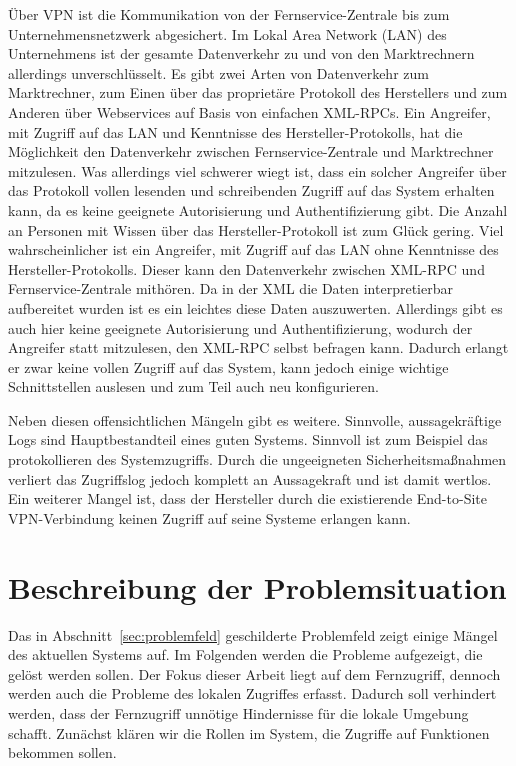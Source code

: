 \documentclass[11pt,a4paper]{report}
\begin{document}
Über VPN ist die Kommunikation von der Fernservice-Zentrale bis zum Unternehmensnetzwerk abgesichert. Im Lokal Area Network (LAN) des Unternehmens ist der gesamte Datenverkehr zu und von den Marktrechnern allerdings unverschlüsselt. Es gibt zwei Arten von Datenverkehr zum Marktrechner, zum Einen über das proprietäre Protokoll des Herstellers und zum Anderen über Webservices auf Basis von einfachen XML-RPCs. Ein Angreifer, mit Zugriff auf das LAN und Kenntnisse des Hersteller-Protokolls, hat die Möglichkeit den Datenverkehr zwischen Fernservice-Zentrale und Marktrechner mitzulesen. Was allerdings viel schwerer wiegt ist, dass ein solcher Angreifer über das Protokoll vollen lesenden und schreibenden Zugriff auf das System erhalten kann, da es keine geeignete Autorisierung und Authentifizierung gibt. Die Anzahl an Personen mit Wissen über das Hersteller-Protokoll ist zum Glück gering. Viel wahrscheinlicher ist ein Angreifer, mit Zugriff auf das LAN ohne Kenntnisse des Hersteller-Protokolls. Dieser kann den Datenverkehr zwischen XML-RPC und Fernservice-Zentrale mithören. Da in der XML die Daten interpretierbar aufbereitet wurden ist es ein leichtes diese Daten auszuwerten. Allerdings gibt es auch hier keine geeignete Autorisierung und Authentifizierung, wodurch der Angreifer statt mitzulesen, den XML-RPC selbst befragen kann. Dadurch erlangt er zwar keine vollen Zugriff auf das System, kann jedoch einige wichtige Schnittstellen auslesen und zum Teil auch neu konfigurieren. 

Neben diesen offensichtlichen Mängeln gibt es weitere. Sinnvolle, aussagekräftige Logs sind Hauptbestandteil eines guten Systems. Sinnvoll ist zum Beispiel das protokollieren des Systemzugriffs. Durch die ungeeigneten Sicherheitsmaßnahmen verliert das Zugriffslog jedoch komplett an Aussagekraft und ist damit wertlos. Ein weiterer Mangel ist, dass der Hersteller durch die existierende End-to-Site VPN-Verbindung keinen Zugriff auf seine Systeme erlangen kann. 


\section{Beschreibung der Problemsituation}

Das in Abschnitt~\ref{sec:problemfeld} geschilderte Problemfeld zeigt einige Mängel des aktuellen Systems auf. Im Folgenden werden die Probleme aufgezeigt, die gelöst werden sollen. Der Fokus dieser Arbeit liegt auf dem Fernzugriff, dennoch werden auch die Probleme des lokalen Zugriffes erfasst. Dadurch soll verhindert werden, dass der Fernzugriff unnötige Hindernisse für die lokale Umgebung schafft. 
Zunächst klären wir die Rollen im System, die Zugriffe auf Funktionen bekommen sollen. 
\end{document}
